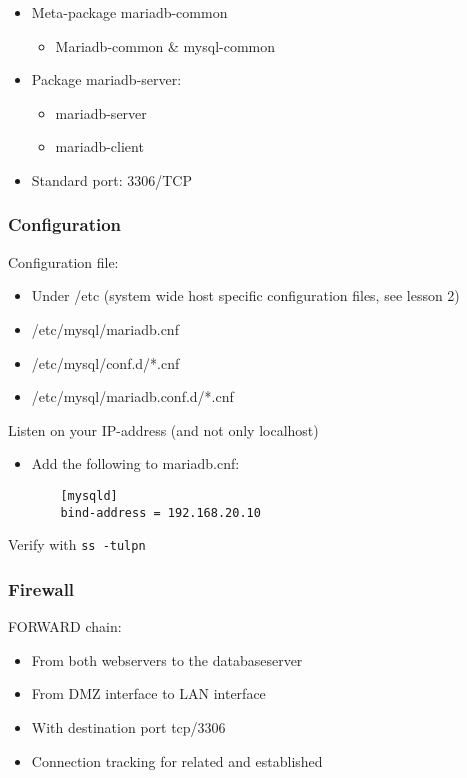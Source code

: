 \documentclass{article}
\begin{document}
\begin{itemize}
    \item Meta-package mariadb-common
    \begin{itemize}
        \item Mariadb-common \& mysql-common
    \end{itemize}
    \item Package mariadb-server:
    \begin{itemize}
        \item mariadb-server
        \item mariadb-client
    \end{itemize}
    \item Standard port: 3306/TCP
\end{itemize}

\subsubsection{Configuration}

Configuration file:

\begin{itemize}
    \item Under /etc (system wide host specific configuration files, see lesson 2)
    \item /etc/mysql/mariadb.cnf
    \item /etc/mysql/conf.d/*.cnf
    \item /etc/mysql/mariadb.conf.d/*.cnf
\end{itemize}

Listen on your IP-address (and not only localhost)

\begin{itemize}
    \item Add the following to mariadb.cnf:
    \begin{verbatim}
    [mysqld]
    bind-address = 192.168.20.10
    \end{verbatim}
\end{itemize}

Verify with \texttt{ss -tulpn}

\subsubsection{Firewall}

FORWARD chain:

\begin{itemize}
    \item From both webservers to the databaseserver
    \item From DMZ interface to LAN interface
    \item With destination port tcp/3306
    \item Connection tracking for related and established
\end{itemize}
\end{document}
